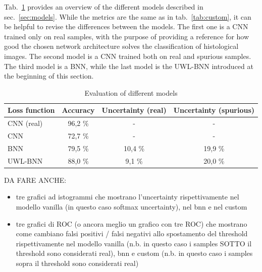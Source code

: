 \documentclass[11pt,twoside,a4paper]{article}
\begin{document}
Tab.~\ref{tab:colab} provides an overview of the different models described in sec.~\ref{sec:models}. While the metrics are the same as in tab.~\ref{tab:custom}, it can be helpful to revise the differences between the models. The first one is a CNN trained only on real samples, with the purpose of providing a reference for how good the chosen network architecture solves the classification of histological images.
The second model is a CNN trained both on real and spurious samples. The third model is a BNN, while the last model is the UWL-BNN introduced at the beginning of this section.


\begin{table}[!h]
  \begin{adjustwidth}{-.5in}{-.5in}
  \begin{center}
    \begin{tabular}{l | c | c | c}
      Loss function	& Accuracy	& Uncertainty (real)	& Uncertainty (spurious) \\
      \hline
      CNN (real)	& 96,2 \%		& - 				& - \\      
      CNN		& 72,7 \%		& - 				& - \\      
      BNN		& 79,5 \%		& 10,4 \% 			& 19,9 \% \\      
      UWL-BNN		& 88,0 \%		& 9,1  \% 			& 20,0 \% \\       
    \end{tabular}
    \caption{Evaluation of different models}
    \label{tab:colab}
  \end{center}
  \end{adjustwidth}
\end{table}

DA FARE ANCHE:
\begin{itemize}
\item tre grafici ad istogrammi che mostrano l'uncertainty rispettivamente nel modello vanilla (in questo caso softmax uncertainty), nel bnn e nel custom
\item tre grafici di ROC (o ancora meglio un grafico con tre ROC) che mostrano come cambiano falsi positivi / falsi negativi allo spostamento del threshold rispettivamente nel modello vanilla (n.b. in questo caso i samples SOTTO il threshold sono considerati real), bnn e custom (n.b. in questo caso i samples sopra il threshold sono considerati real)
\end{itemize}
\end{document}
